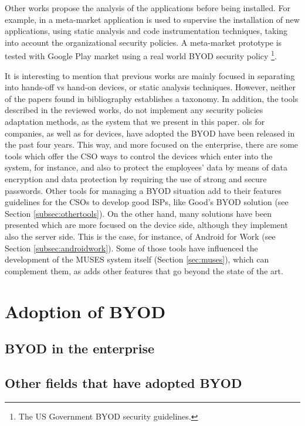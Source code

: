 Other works propose the analysis of the applications before being installed. For example, in \cite{Armando14metamarket} a meta-market application is used to supervise the installation of new applications, using static analysis and code instrumentation techniques, taking into account the organizational security policies. A meta-market prototype is tested with Google Play market using a real world BYOD security policy \footnote{The US Government BYOD security guidelines.}.


It is interesting to mention that previous works are mainly focused in separating into hands-off vs hand-on devices, or static analysis techniques. However, neither of the papers found in bibliography establishes a taxonomy. In addition, the tools described in the reviewed works, do not implement any security policies adaptation methods, as the system that we present in this paper.
ols for companies, as well as for devices, have adopted the BYOD have been released in the past four years. This way, and more focused on the enterprise, there are some tools which offer the CSO ways to control the devices which enter into the system, for instance, and also to protect the employees' data by means of data encryption and data protection by requiring the use of strong and secure passwords. Other tools for managing a BYOD situation add to their features guidelines for the CSOs to develop good ISPs, like Good's BYOD solution (see Section \ref{subsec:othertools}). On the other hand, many solutions have been presented which are more focused on the device side, although they implement also the server side. This is the case, for instance, of Android for Work (see Section \ref{subsec:androidwork}). Some of those tools have influenced the development of the MUSES system  itself (Section \ref{sec:muses}), which can complement them, as adds other features that go beyond the state of the art.

\section{Adoption of BYOD}
\label{sec:byodadoption}

\subsection{BYOD in the enterprise}
\label{subsec:byodcompany}

\subsection{Other fields that have adopted BYOD}
\label{subsec:byodother}

